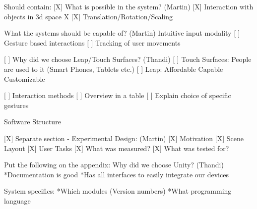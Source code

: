 Should contain:
	[X] What is possible in the system? (Martin)
        [X] Interaction with objects in 3d space X
        [X] Translation/Rotation/Scaling
	
    What the systems should be capable of? (Martin)
    	Intuitive input modality
        [ ] Gesture based interactions
        [ ] Tracking of user movements
    
     [ ] Why did we choose Leap/Touch Surfaces? (Thandi)
    	[ ] Touch Surfaces:
        	People are used to it (Smart Phones, Tablets etc.)
    	[ ] Leap:
        	Affordable
            Capable
            Customizable    
            
    [ ] Interaction methods
    	[ ] Overview in a table
        [ ] Explain choice of specific gestures
	
    Software Structure
      
	[X] Separate section - Experimental Design: (Martin)
		[X] Motivation
        [X] Scene Layout
    	[X] User Tasks
        [X] What was measured?
        [X] What was tested for?
    
    
Put the following on the appendix:
Why did we choose Unity? (Thandi)
    	*Documentation is good
        *Has all interfaces to easily integrate our devices
    
    System specifics:
    	*Which modules (Version numbers)
        *What programming language
     
\fi